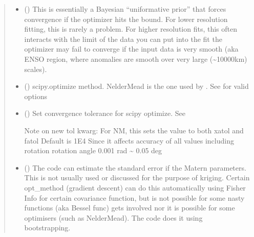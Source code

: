 \documentclass[letterpaper,10pt,english]{sphinxmanual}
\begin{document}
\begin{fulllineitems}
\begin{fulllineitems}
\begin{quote}
\begin{description}
\begin{itemize}
\item {}
\sphinxAtStartPar
{} () \textendash{} This is essentially a Bayesian “uniformative prior”
that forces convergence if the optimizer hits the bound.
For lower resolution fitting, this is rarely a problem.
For higher resolution fits, this often interacts with
the limit of the data you can put into the fit the optimizer
may fail to converge if the input data is very smooth (aka ENSO
region, where anomalies are smooth over very large (\textasciitilde{}10000km)
scales).

\item {}
\sphinxAtStartPar
{} () \textendash{} scipy.optimize method. Nelder\sphinxhyphen{}Mead is the one used by .
See 
for valid options

\item {}
\sphinxAtStartPar
{} () \textendash{}
\sphinxAtStartPar
Set convergence tolerance for scipy optimize.
See 

\sphinxAtStartPar
Note on new tol kwarg:
For N\sphinxhyphen{}M, this sets the value to both xatol and fatol
Default is 1E\sphinxhyphen{}4
Since it affects accuracy of all values including rotation
rotation angle 0.001 rad \textasciitilde{} 0.05 deg


\item {}
\sphinxAtStartPar
{} (\sphinxstyleliteralemphasis{\sphinxupquote{ | }}) \textendash{} The code can estimate the standard error if the Matern parameters.
This is not usually used or discussed for the purpose of kriging.
Certain opt\_method (gradient descent) can do this automatically
using Fisher Info for certain covariance function,
but is not possible for some nasty functions (aka Bessel
func) gets involved nor it is possible for some optimisers
(such as Nelder\sphinxhyphen{}Mead).
The code does it using bootstrapping.


\end{itemize}
\end{description}
\end{quote}
\end{fulllineitems}
\end{fulllineitems}
\end{document}
